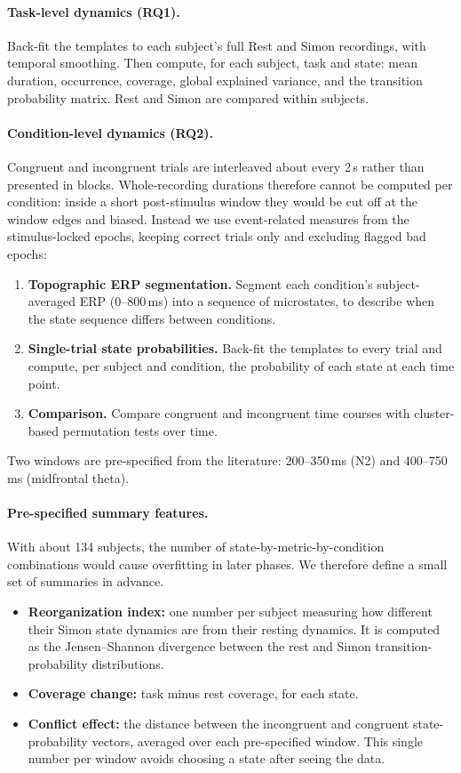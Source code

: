 \documentclass[11pt,a4paper]{article}
\begin{document}
\paragraph{Task-level dynamics (RQ1).} Back-fit the templates to each subject's full Rest and Simon recordings, with temporal smoothing. Then compute, for each subject, task and state: mean duration, occurrence, coverage, global explained variance, and the transition probability matrix. Rest and Simon are compared within subjects.

\paragraph{Condition-level dynamics (RQ2).} Congruent and incongruent trials are interleaved about every 2\,s rather than presented in blocks. Whole-recording durations therefore cannot be computed per condition: inside a short post-stimulus window they would be cut off at the window edges and biased. Instead we use event-related measures from the stimulus-locked epochs, keeping correct trials only and excluding flagged bad epochs:
\begin{enumerate}
  \item \textbf{Topographic ERP segmentation.} Segment each condition's subject-averaged ERP (0--800\,ms) into a sequence of microstates, to describe when the state sequence differs between conditions.
  \item \textbf{Single-trial state probabilities.} Back-fit the templates to every trial and compute, per subject and condition, the probability of each state at each time point.
  \item \textbf{Comparison.} Compare congruent and incongruent time courses with cluster-based permutation tests over time.
\end{enumerate}
Two windows are pre-specified from the literature: 200--350\,ms (N2) and 400--750\,ms (midfrontal theta).

\paragraph{Pre-specified summary features.} With about 134 subjects, the number of state-by-metric-by-condition combinations would cause overfitting in later phases. We therefore define a small set of summaries in advance.
\begin{itemize}
  \item \textbf{Reorganization index:} one number per subject measuring how different their Simon state dynamics are from their resting dynamics. It is computed as the Jensen--Shannon divergence between the rest and Simon transition-probability distributions.
  \item \textbf{Coverage change:} task minus rest coverage, for each state.
  \item \textbf{Conflict effect:} the distance between the incongruent and congruent state-probability vectors, averaged over each pre-specified window. This single number per window avoids choosing a state after seeing the data.
\end{itemize}
\end{document}

